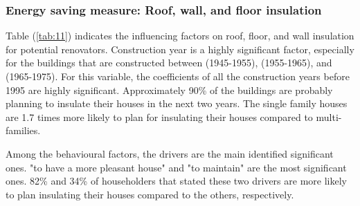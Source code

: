 \documentclass[preprint,12pt,3p]{elsarticle}
\begin{document}
\subsubsection{Energy saving measure: Roof, wall, and floor insulation}

Table (\ref{tab:11}) indicates the influencing factors on roof, floor, and wall insulation for potential renovators. Construction year is a highly significant factor, especially for the buildings that are constructed between (1945-1955), (1955-1965), and (1965-1975). For this variable, the coefficients of all the construction years before 1995 are highly significant. Approximately 90\% of the buildings are probably planning to insulate their houses in the next two years. The single family houses are 1.7 times more likely to plan for insulating their houses compared to multi-families.   

Among the behavioural factors, the drivers are the main identified significant ones. "to have a more pleasant house" and "to maintain" are the most significant ones. 82\% and 34\% of householders that stated these two drivers are more likely to plan insulating their houses compared to the others, respectively. 
\end{document}
